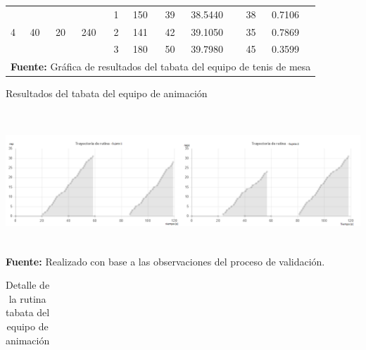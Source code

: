 \begin{landscape}
\begin{table}[H]
\begin{center}
\begin{tabular}{|l|l|l|l|l|l|l|l|l|l|}
\multirow{3}{*}{4} & \multirow{3}{*}{40} & \multirow{3}{*}{20} & \multirow{3}{*}{240} & 1 & 150 & 39 & 38.5440 & 38 & 0.7106 \\ \cline{5-10} 
 &  &  &  & 2 & 141 & 42 & 39.1050 & 35 & 0.7869 \\ \cline{5-10} 
 &  &  &  & 3 & 180 & 50 & 39.7980 & 45 & 0.3599 \\ \hline
 \multicolumn{10}{l}{\textbf{Fuente:} Gr\'afica de resultados del tabata del equipo de tenis de mesa}
\end{tabular}
\end{center}
\end{table}
\begin{chart}[H]
	\caption{Resultados del tabata del equipo de animaci\'on}
	\label{fig:resTabCheerleader}
	\centering
	\includegraphics[width=610px,height=200px]{graphics/resultados/ResultRecognitionCheerleader.png} \\
	\textbf{Fuente:} Realizado con base a las observaciones del proceso de validaci\'on.
\end{chart}
\begin{table}[H]
\begin{center}
\caption{Detalle de la rutina tabata del equipo de animaci\'on}
\label{tab:detailResultsCheerleader}
\begin{tabular}{|l|l|l|l|l|l|l|l|l|l|}
\hline

\end{tabular}
\end{center}
\end{table}
\end{landscape}
